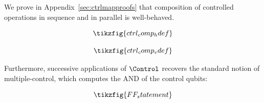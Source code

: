 We prove in Appendix~\ref{sec:ctrlmapproofs} that composition of controlled operations in sequence and in parallel is well-behaved.

\begin{prop}\label{prop:ctrl_comp_h}
\begin{equation}
	\tikzfig{ctrl_comp_hdef}
\end{equation}\end{prop}

\begin{prop}\label{prop:ctrl_comp_v}
\begin{equation}
	\tikzfig{ctrl_comp_vdef}
\end{equation}
\end{prop}

Furthermore, successive applications of $\Control$ recovers the standard notion of multiple-control, which computes the AND of the control qubits:
\begin{prop}\label{prop:FF}
    \begin{equation}
        \tikzfig{FF_statement}
    \end{equation}
\end{prop}